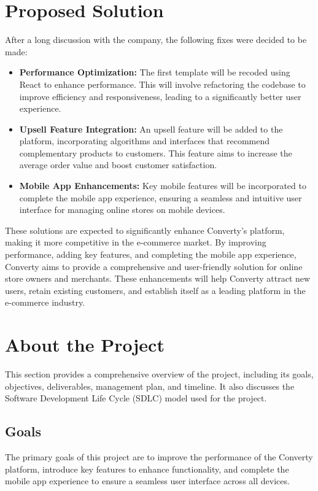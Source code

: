 \section{Proposed Solution}
After a long discussion with the company, the following fixes were decided to be made:

\begin{itemize}
  \item \textbf{Performance Optimization:} The first template will be recoded using React to enhance performance. This will involve refactoring the codebase to improve efficiency and responsiveness, leading to a significantly better user experience.
  \item \textbf{Upsell Feature Integration:} An upsell feature will be added to the platform, incorporating algorithms and interfaces that recommend complementary products to customers. This feature aims to increase the average order value and boost customer satisfaction.
  \item \textbf{Mobile App Enhancements:} Key mobile features will be incorporated to complete the mobile app experience, ensuring a seamless and intuitive user interface for managing online stores on mobile devices.
\end{itemize}

These solutions are expected to significantly enhance Converty's platform, making it more competitive in the e-commerce market. By improving performance, adding key features, and completing the mobile app experience, Converty aims to provide a comprehensive and user-friendly solution for online store owners and merchants. These enhancements will help Converty attract new users, retain existing customers, and establish itself as a leading platform in the e-commerce industry.
\newline

\section{About the Project}
This section provides a comprehensive overview of the project, including its goals, objectives, deliverables, management plan, and timeline. It also discusses the Software Development Life Cycle (SDLC) model used for the project.

\subsection{Goals}
The primary goals of this project are to improve the performance of the Converty platform, introduce key features to enhance functionality, and complete the mobile app experience to ensure a seamless user interface across all devices.

